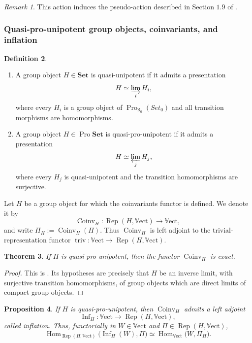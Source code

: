 \documentclass[11pt,a4paper,twoside]{amsart}
\newtheorem{theorem}{Theorem}[section]
\newtheorem{proposition}[theorem]{Proposition}
\theoremstyle{definition}
\newtheorem{definition}[theorem]{Definition}
\theoremstyle{remark}
\newtheorem{remark}[theorem]{Remark}
\newcommand{\prl}{\varprojlim}
\newcommand{\inl}{\varinjlim}
\newcommand{\Hom}{\operatorname{Hom}}
\newcommand{\Pro}{\operatorname{Pro}}
\newcommand{\Rep}{\operatorname{Rep}}
\newcommand{\bSet}{\mathbf{Set}}
\newcommand{\mVect}{\mathbb{V}\mathrm{ect}}
\begin{document}
\begin{remark}

This action induces the pseudo-action described in Section $1.9$ of \cite{GK}.

\end{remark}

\subsubsection{Quasi-pro-unipotent group objects, coinvariants, and inflation}

\begin{definition}\label{quasi-pro-unipotent}
\begin{enumerate}
\item A group object $H\in\bSet$ is quasi-unipotent if it admits a presentation
$$
H\simeq\inl_i H_i,
$$
where every $H_i$ is a group object of $\Pro_{\aleph_0}(Set_0)$ and all transition morphisms are homomorphisms.
\item A group object $H\in\Pro\bSet$ is quasi-pro-unipotent if it admits a presentation
$$
H\simeq\prl_j H_j,
$$
where every $H_j$ is quasi-unipotent and the transition homomorphisms are  surjective.
\end{enumerate}
\end{definition}

Let $H$ be a group object for which the coinvariants functor is defined. We denote it by
$$
\operatorname{Coinv}_H:\Rep(H,\mVect)\longrightarrow\mVect,
$$
and write $\Pi_H:=\operatorname{Coinv}_H(\Pi)$. Thus $\operatorname{Coinv}_H$ is left adjoint to the trivial-representation functor $\operatorname{triv}:\mVect\to\Rep(H,\mVect)$.

\begin{theorem}\label{coinvariants-exact}
If $H$ is quasi-pro-unipotent, then the functor $\operatorname{Coinv}_H$ is exact.
\end{theorem}

\begin{proof}
This is \cite[Lemma~2.7]{GK}. Its hypotheses are precisely that $H$ be an inverse limit, with surjective transition homomorphisms, of group objects which are direct limits of compact group objects.
\end{proof}

\begin{proposition}\label{inflation}
If $H$ is quasi-pro-unipotent, then $\operatorname{Coinv}_H$ admits a left adjoint
$$
\operatorname{Inf}_H:\mVect\longrightarrow\Rep(H,\mVect),
$$
called inflation. Thus, functorially in $W\in\mVect$ and $\Pi\in\Rep(H,\mVect)$,
$$
\Hom_{\Rep(H,\mVect)}\bigl(\operatorname{Inf}_H(W),\Pi\bigr)
\simeq
\Hom_{\mVect}\bigl(W,\Pi_H\bigr).
$$
\end{proposition}
\end{document}
